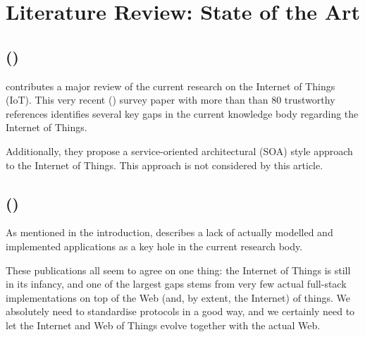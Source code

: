 \section{Literature Review: State of the Art}

\subsection{ (\citeyear{xu-he-li:internet-of-things-in-industries-a-survery:2014})}

\textcite{xu-he-li:internet-of-things-in-industries-a-survery:2014} contributes a major review of the current research on the Internet of Things (IoT). This very recent (\citeyear{xu-he-li:internet-of-things-in-industries-a-survery:2014}) survey paper with more than than 80 trustworthy references identifies several key gaps in the current knowledge body regarding the Internet of Things.

Additionally, they propose a service-oriented architectural (SOA) style approach to the Internet of Things. This approach is not considered by this article.

\subsection{ (\citeyear{paganelli-turchi-guili:a-web-of-things-framework-for-restful-applications-and-its-experimentation-in-a-smart-city})}

As mentioned in the introduction, \textcite{paganelli-turchi-guili:a-web-of-things-framework-for-restful-applications-and-its-experimentation-in-a-smart-city} describes a lack of actually modelled and implemented applications as a key hole in the current research body.



These publications all seem to agree on one thing: the Internet of Things is still in its infancy, and one of the largest gaps stems from very few actual full-stack implementations on top of the Web (and, by extent, the Internet) of things. We absolutely need to standardise protocols in a good way, and we certainly need to let the Internet and Web of Things evolve together with the actual Web.
